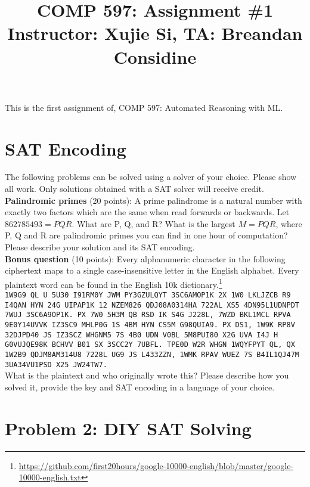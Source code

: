 \documentclass[11pt]{article}
\title{COMP 597: Assignment \#1\\\vspace{10pt}\small{Instructor: Xujie Si, TA: Breandan Considine}}
\begin{document}
    \maketitle
    \noindent This is the first assignment of, COMP 597: Automated Reasoning with ML.

    \section{SAT Encoding}

    The following problems can be solved using a solver of your choice. Please show all work. Only solutions obtained with a SAT solver will receive credit.\\

    \noindent \textbf{Palindromic primes} (20 points): A prime palindrome is a natural number with exactly two factors which are the same when read forwards or backwards. Let $862785493 = PQR$. What are P, Q, and R? What is the largest $M=PQR$, where P, Q and R are palindromic primes you can find in one hour of computation? Please describe your solution and its SAT encoding.\\

    \noindent \textbf{Bonus question} (10 points): Every alphanumeric character in the following ciphertext maps to a single case-insensitive letter in the English alphabet. Every plaintext word can be found in the English 10k dictionary.\footnote{\url{https://github.com/first20hours/google-10000-english/blob/master/google-10000-english.txt}}\\

    \noindent \tiny\texttt{1W9G9 QL U 5U30 I91RM0Y JWM PY3GZULQYT 3SC6AMOP1K 2X 1W0 LKLJZCB R9 I4QAN HYN 24G UIPAP1K 12 NZEM826 QDJ08A0314HA 722AL XS5 4DN95L1UDNPDT 7WUJ 3SC6A9OP1K. PX 7W0 5H3M QB RSD IK S4G J228L, 7WZD BKL1MCL RPVA 9E0Y14UVVK IZ3SC9 MHLP0G 1S 4BM HYN CS5M G98QUIA9. PX DS1, 1W9K RP8V 32DJPD40 JS IZ3SCZ WHGNM5 7S 4B0 UDN V0BL 5M8PUI80 X2G UVA I4J H G0VUJQE98K BCHVV B01 SX 3SCC2Y 7UBFL. TPE0D W2R WHGN 1WQYFPYT QL, QX 1W2B9 QDJM8AM314U8 7228L UG9 JS L433ZZN, 1WMK RPAV WUEZ 7S B4IL1QJ47M 3UA34VU1PSD X25 JW24TW7.}\normalsize\\

    \noindent What is the plaintext and who originally wrote this? Please describe how you solved it, provide the key and SAT encoding in a language of your choice.

    \pagebreak\section{Problem 2: DIY SAT Solving}
\end{document}
